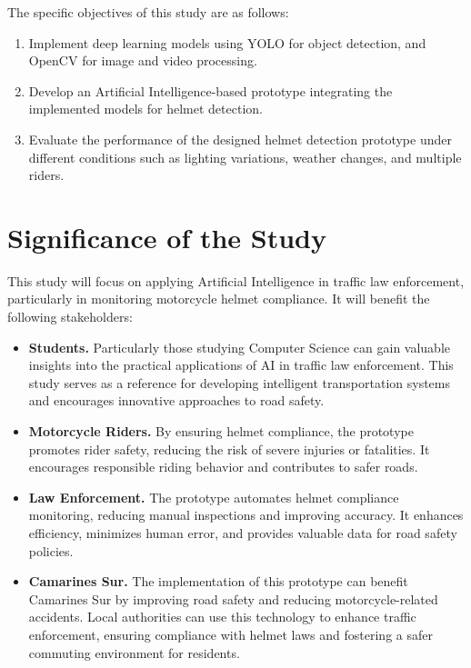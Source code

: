 \begin{refsection}
The specific objectives of this study are as follows:

\begin{enumerate}
    \item Implement deep learning models using YOLO for object detection, and OpenCV for image and video processing.
    \item Develop an Artificial Intelligence-based prototype integrating the implemented models for helmet detection. 
    \item Evaluate the performance of the designed helmet detection prototype under different conditions such as lighting variations, weather changes, and multiple riders.  
\end{enumerate}
   

\section{Significance of the Study}

This study will focus on applying Artificial Intelligence in traffic law enforcement, particularly in monitoring motorcycle helmet compliance. It will benefit the following stakeholders:

\begin{itemize}
    \item \textbf{Students.} Particularly those studying Computer Science can gain valuable insights into the practical applications of AI in traffic law enforcement. This study serves as a reference for developing intelligent transportation systems and encourages innovative approaches to road safety.
    
    \item \textbf{Motorcycle Riders.} By ensuring helmet compliance, the prototype promotes rider safety, reducing the risk of severe injuries or fatalities. It encourages responsible riding behavior and contributes to safer roads.
    
    \item \textbf{Law Enforcement.} The prototype automates helmet compliance monitoring, reducing manual inspections and improving accuracy. It enhances efficiency, minimizes human error, and provides valuable data for road safety policies.
    
    \item \textbf{Camarines Sur.} The implementation of this prototype can benefit Camarines Sur by improving road safety and reducing motorcycle-related accidents. Local authorities can use this technology to enhance traffic enforcement, ensuring compliance with helmet laws and fostering a safer commuting environment for residents.
    

\end{itemize}
\end{refsection}

